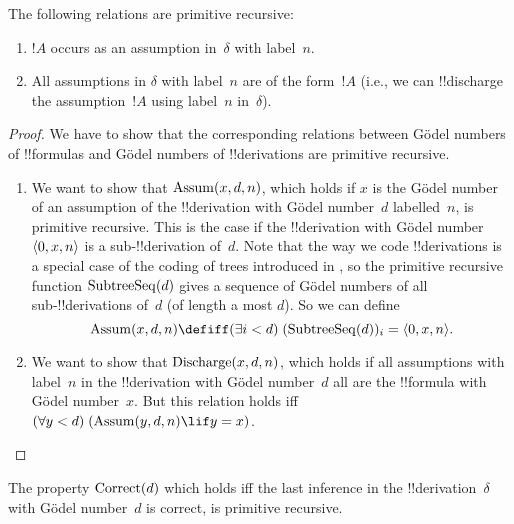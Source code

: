 \documentclass[../../../include/open-logic-section]{subfiles}
\begin{document}
\begin{prop}
  The following relations are primitive recursive:
  \begin{enumerate}
  \item $!A$ occurs as an assumption in~$\delta$ with label~$n$.
  \item All assumptions in $\delta$ with label~$n$ are of the form~$!A$
    (i.e., we can !!{discharge} the assumption~$!A$ using label~$n$
    in~$\delta$).
  \end{enumerate}
\end{prop}

\begin{proof}
  We have to show that the corresponding relations between G\"odel
  numbers of !!{formula}s and G\"odel numbers of !!{derivation}s are
  primitive recursive.
  \begin{enumerate}
  \item We want to show that $\mathrm{Assum}(x, d, n)$, which holds if $x$
    is the G\"odel number of an assumption of the !!{derivation} with
    G\"odel number~$d$ labelled~$n$, is primitive recursive.  This is
    the case if the !!{derivation} with G\"odel number~$\langle 0, x,
      n \rangle$ is a sub-!!{derivation} of~$d$. Note that the way we code
    !!{derivations} is a special case of the coding of trees introduced in
    , so the primitive recursive function
    $\mathrm{SubtreeSeq}(d)$ gives a sequence of G\"odel numbers of all
    sub-!!{derivation}s of~$d$ (of length a most $d$). So we can
    define
    \[
    \fn{Assum}(x, d, n) \defiff \bexists{i<d}{(\fn{SubtreeSeq}(d))_i =
      \tuple{0, x, n}}.
    \]
  \item We want to show that $\mathrm{Discharge}(x, d, n)$, which holds if
    all assumptions with label~$n$ in the !!{derivation} with G\"odel
    number~$d$ all are the !!{formula} with G\"odel number~$x$.  But
    this relation holds iff $\bforall{y<d}{(\fn{Assum}(y, d, n) \lif y
      = x)}$.
  \end{enumerate}
\end{proof}

\begin{prop}
  The property $\mathrm{Correct}(d)$ which holds iff the last inference in
  the !!{derivation}~$\delta$ with G\"odel number~$d$ is correct, is
  primitive recursive.
\end{prop}
\end{document}
